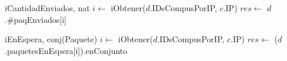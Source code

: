\begin{Algoritmos}
  \begin{algoritmo}{iCantidadEnviados}{, }{nat}
     $i \gets$ iObtener($d$.IDsCompusPorIP, $c$.IP)\;
    $res \gets$ $d$.\#paqEnviados[i]\;
  \end{algoritmo}

  \begin{algoritmo}{iEnEspera}{, }{conj(Paquete)}
     $i \gets$ iObtener($d$.IDsCompusPorIP, $c$.IP)\;
    $res \gets$ ($d$.paquetesEnEspera[i]).enConjunto\;
  \end{algoritmo}

\end{Algoritmos}

